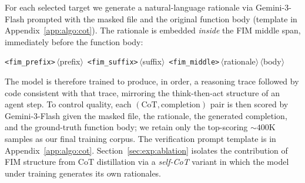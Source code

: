 For each selected target we generate a natural-language rationale via
Gemini-3-Flash prompted with the masked file and the original function
body (template in Appendix~\ref{app:algo:cot}). The rationale is
embedded \emph{inside} the FIM middle span, immediately before the
function body:
\vspace{-0.5ex}
\begin{center}\small
\texttt{<fim\_prefix>}\,$\langle$prefix$\rangle$\,%
\texttt{<fim\_suffix>}\,$\langle$suffix$\rangle$\,%
\texttt{<fim\_middle>}\,$\langle$rationale$\rangle$\,$\langle$body$\rangle$
\end{center}
The model is therefore trained to produce, in order, a reasoning trace
followed by code consistent with that trace, mirroring the
think-then-act structure of an agent step. To control quality, each
$(\text{CoT}, \text{completion})$ pair is then scored by Gemini-3-Flash
given the masked file, the rationale, the generated completion, and the
ground-truth function body; we retain only the top-scoring
$\sim\!400$K samples as our final training corpus. The verification
prompt template is in Appendix~\ref{app:algo:cot}.
Section~\ref{sec:exp:ablation}
isolates the contribution of FIM structure from CoT distillation via a
\emph{self-CoT} variant in which the model under training generates its
own rationales.
